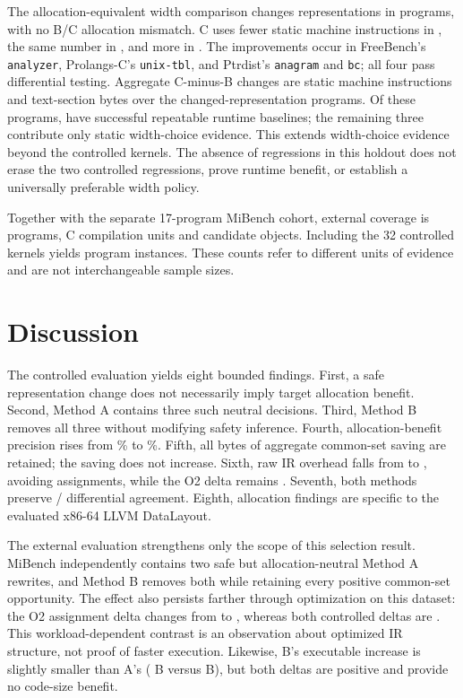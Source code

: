 \documentclass[11pt,twocolumn]{article}
\begin{document}
The allocation-equivalent width comparison changes representations in
\ExpandedWidthPrograms{} programs, with no B/C allocation mismatch. C uses
fewer static machine instructions in \ExpandedWidthBetter{}, the same number
in \ExpandedWidthEqual{}, and more in \ExpandedWidthWorse{}. The improvements
occur in FreeBench's \texttt{analyzer}, Prolangs-C's \texttt{unix-tbl}, and
Ptrdist's \texttt{anagram} and \texttt{bc}; all four pass differential testing.
Aggregate C-minus-B changes are \ExpandedInstructionDelta{} static machine
instructions and \ExpandedTextDelta{} text-section bytes over the
changed-representation programs.
Of these programs, \ExpandedWidthValidated{} have successful repeatable runtime
baselines; the remaining three contribute only static width-choice evidence.
This extends width-choice evidence beyond the controlled kernels. The absence
of regressions in this holdout does not erase the two controlled regressions,
prove runtime benefit, or establish a universally preferable width policy.

Together with the separate 17-program MiBench cohort, external coverage is
\AllExternalPrograms{} programs, \AllExternalUnits{} C compilation units and
\AllExternalCandidates{} candidate objects. Including the 32 controlled
kernels yields \AllPrograms{} program instances. These counts refer to
different units of evidence and are not interchangeable sample sizes.

\section{Discussion}

The controlled evaluation yields eight bounded findings. First, a safe
representation change does not necessarily imply target allocation benefit.
Second, Method A contains three such neutral decisions. Third, Method B removes
all three without modifying safety inference. Fourth, allocation-benefit
precision rises from \APrecision\% to \BPrecision\%. Fifth, all
\CommonSavedBytes{} bytes of aggregate common-set saving are retained; the
saving does not increase. Sixth, raw IR overhead falls from \ARawIR{} to
\BRawIR{}, avoiding \RawIRAvoided{} assignments, while the O2 delta remains
\BOtwoIR{}. Seventh, both methods preserve \RuntimePassed{}/\RuntimeTotal{}
differential agreement. Eighth, allocation findings are specific to the
evaluated x86-64 LLVM DataLayout.

The external evaluation strengthens only the scope of this selection result.
MiBench independently contains two safe but allocation-neutral Method A
rewrites, and Method B removes both while retaining every positive common-set
opportunity. The effect also persists farther through optimization on this
dataset: the O2 assignment delta changes from \ExternalAOtwoIR{} to
\ExternalBOtwoIR{}, whereas both controlled deltas are \AOtwoIR{}. This
workload-dependent contrast is an observation about optimized IR structure, not
proof of faster execution. Likewise, B's executable increase is slightly
smaller than A's (\ExternalBExecutableDelta{} B versus
\ExternalAExecutableDelta{} B), but both deltas are positive and provide no
code-size benefit.
\end{document}
